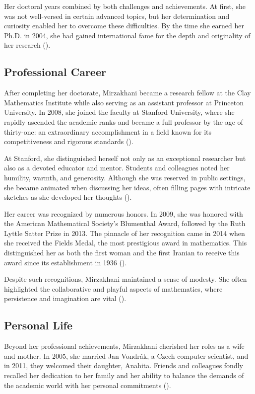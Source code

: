 Her doctoral years combined by both challenges and achievements. At first, she was not well-versed in certain advanced topics, but her determination and curiosity enabled her to overcome these difficulties. By the time she earned her Ph.D. in 2004, she had gained international fame for the depth and originality of her research (\cite{series}).

\subsection{Professional Career}
After completing her doctorate, Mirzakhani became a research fellow at the Clay Mathematics Institute while also serving as an assistant professor at Princeton University. In 2008, she joined the faculty at Stanford University, where she rapidly ascended the academic ranks and became a full professor by the age of thirty-one: an extraordinary accomplishment in a field known for its competitiveness and rigorous standards (\cite{gibbons,series}).

At Stanford, she distinguished herself not only as an exceptional researcher but also as a devoted educator and mentor. Students and colleagues noted her humility, warmth, and generosity. Although she was reserved in public settings, she became animated when discussing her ideas, often filling pages with intricate sketches as she developed her thoughts (\cite{zagrebnov}).

Her career was recognized by numerous honors. In 2009, she was honored with the American Mathematical Society's Blumenthal Award, followed by the Ruth Lyttle Satter Prize in 2013. The pinnacle of her recognition came in 2014 when she received the Fields Medal, the most prestigious award in mathematics. This distinguished her as both the first woman and the first Iranian to receive this award since its establishment in 1936 (\cite{zagrebnov}).

Despite such recognitions, Mirzakhani maintained a sense of modesty. She often highlighted the collaborative and playful aspects of mathematics, where persistence and imagination are vital (\cite{gibbons}).

\subsection{Personal Life}
Beyond her professional achievements, Mirzakhani cherished her roles as a wife and mother. In 2005, she married Jan Vondrák, a Czech computer scientist, and in 2011, they welcomed their daughter, Anahita. Friends and colleagues fondly recalled her dedication to her family and her ability to balance the demands of the academic world with her personal commitments (\cite{zagrebnov}).

